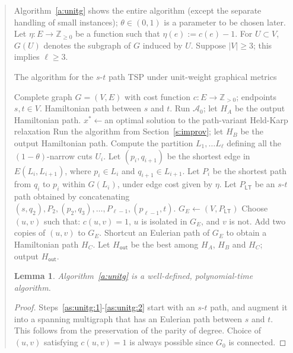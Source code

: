 \documentclass[11pt,letterpaper]{article}
\newtheorem{lemma}{Lemma}
\newcommand{\st}{\mbox{$s$-$t$} }
\begin{document}
\begin{quote}
Algorithm~\ref{a:unitg} shows the entire algorithm (except the separate handling of small instances); $\theta\in(0,1)$ is a parameter to be chosen later. Let $\eta:E\to\mathbb{Z}_{\geq 0}$ be a function such that $\eta(e):=c(e)-1$. For $U\subset V$, $G(U)$ denotes the subgraph of $G$ induced by $U$. Suppose $|V|\geq 3$; this implies $\ell\geq 3$.

\begin{algorithm}[ht]
\caption{The algorithm for the \st path TSP under unit-weight graphical metrics}
\label{a:unitg}
\begin{algorithmic}[1]
	\REQUIRE Complete graph $G=(V,E)$ with cost function $c:E\to\mathbb{Z}_{>0}$; endpoints $s,t\in V$.
	\ENSURE Hamiltonian path between $s$ and $t$.
	\STATE Run $\mathscr{A}_{0}$; let $H_A$ be the output Hamiltonian path.
	\STATE $x^*\gets$an optimal solution to the path-variant Held-Karp relaxation
	\STATE Run the algorithm from Section~\ref{s:improv}; let $H_B$ be the output Hamiltonian path.
	\STATE Compute the partition $L_1,\ldots L_\ell$ defining all the $(1-\theta)$-narrow cuts $U_i$.\label{as:unitg:0}
	\STATE Let $(p_i,q_{i+1})$ be the shortest edge in $E(L_i,L_{i+1})$, where $p_i\in L_i$ and $q_{i+1}\in L_{i+1}$.
	\ENDFOR
	\STATE Let $P_i$ be the shortest path from $q_i$ to $p_i$ within $G(L_i)$, under edge cost given by $\eta$.
	\ENDFOR
	\STATE Let $P_{\mathsf{LT}}$ be an \st path obtained by concatenating $(s,q_2),P_2,(p_2,q_3),\ldots,P_{\ell-1},(p_{\ell-1},t)$.\hspace{-2em}
	\STATE $G_E\gets (V,P_{\mathsf{LT}})$
	\label{as:unitg:1}
	\STATE Choose $(u,v)$ such that: $c(u,v)=1$, $u$ is isolated in $G_E$, and $v$ is not.
	\STATE Add two copies of $(u,v)$ to $G_E$.
	\ENDWHILE \label{as:unitg:2}
	\STATE Shortcut an Eulerian path of $G_E$ to obtain a Hamiltonian path $H_C$.
	\STATE Let $H_{\mathsf{out}}$ be the best among $H_A$, $H_B$ and $H_C$; output $H_{\mathsf{out}}$.
\end{algorithmic}
\end{algorithm}

\begin{lemma}\label{l:wd}
Algorithm~\ref{a:unitg} is a well-defined, polynomial-time algorithm.
\end{lemma}
\begin{proof}
Steps~\ref{as:unitg:1}-\ref{as:unitg:2} start with an \st path, and augment it into a spanning multigraph that has an Eulerian path between $s$ and $t$. This follows from the preservation of the parity of degree. Choice of $(u,v)$ satisfying $c(u,v)=1$ is always possible since $G_0$ is connected.


\end{proof}
\end{quote}
\end{document}
